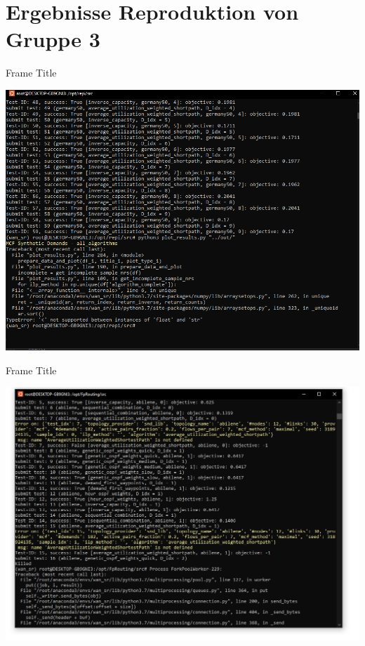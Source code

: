 \documentclass[aspectratio=169,10pt]{beamer}
\begin{document}
\section{Ergebnisse Reproduktion von Gruppe 3}
\begin{frame}{Frame Title}
\begin{center}
    \includegraphics[width=\textwidth]{images/err1.png}
\end{center}
\end{frame}
\begin{frame}{Frame Title}
\begin{center}
    \includegraphics[width=\textwidth]{images/err2.png}
\end{center}
\end{frame}
\end{document}

